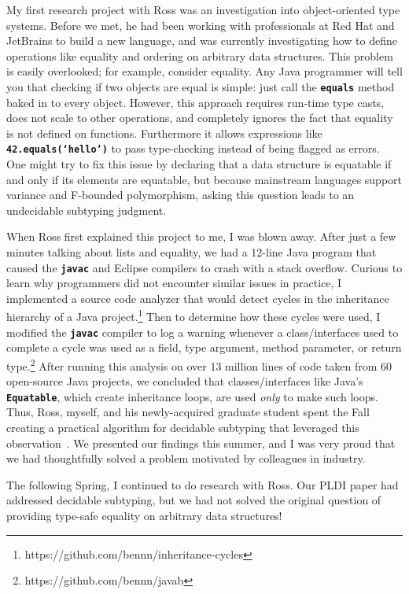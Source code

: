 \documentclass[12pt]{article}
\newcommand{\mono}[1]{\textbf{\texttt{#1}}}
\newcommand{\hdr}[2]{\vspace{-0.4cm}{\flushleft{\hrulefill\\\textbf{#1}\hfill{#2}\\\vspace{-0.2cm}\hrulefill}}\vspace{0.1cm}}
\begin{document}
My first research project with Ross was an investigation into object-oriented type systems.
Before we met, he had been working with professionals at Red Hat and JetBrains to build a new language, and was currently investigating how to define operations like equality and ordering on arbitrary data structures.
This problem is easily overlooked; for example, consider equality.
Any Java programmer will tell you that checking if two objects are equal is simple: just call the \mono{equals} method baked in to every object.
However, this approach requires run-time type casts, does not scale to other operations, and completely ignores the fact that equality is not defined on functions.
Furthermore it allows expressions like \mono{42.equals(`hello')} to pass type-checking instead of being flagged as errors.
One might try to fix this issue by declaring that a data structure is equatable if and only if its elements are equatable, but because mainstream languages support variance and F-bounded polymorphism, asking this question leads to an undecidable subtyping judgment.

When Ross first explained this project to me, I was blown away.
After just a few minutes talking about lists and equality, we had a 12-line Java program that caused the \mono{javac} and Eclipse compilers to crash with a stack overflow.
Curious to learn why programmers did not encounter similar issues in practice, I implemented a source code analyzer that would detect cycles in the inheritance hierarchy of a Java project.\footnote{https://github.com/bennn/inheritance-cycles}
Then to determine how these cycles were used, I modified the \mono{javac} compiler to log a warning whenever a class/interfaces used to complete a cycle was used as a field, type argument, method parameter, or return type.\footnote{https://github.com/bennn/javab}
After running this analysis on over 13 million lines of code taken from 60 open-source Java projects, we concluded that classes/interfaces like Java's \mono{Equatable}, which create inheritance loops, are used \emph{only} to make such loops.
Thus, Ross, myself, and his newly-acquired graduate student spent the Fall creating a practical algorithm for decidable subtyping that leveraged this observation~\cite{shapes}.
We presented our findings this summer, and I was very proud that we had thoughtfully solved a problem motivated by colleagues in industry.

\hdr{Conditional Inheritance}{Spring 2014}

The following Spring, I continued to do research with Ross.
Our PLDI paper had addressed decidable subtyping, but we had not solved the original question of providing type-safe equality on arbitrary data structures!
\end{document}
